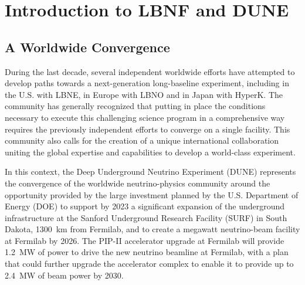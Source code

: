 

\chapter{Introduction to LBNF and DUNE}
\label{ch:project-overview}

%
%
\section{A Worldwide Convergence}

During the last decade, several independent worldwide efforts have attempted to develop paths towards a next-generation long-baseline experiment, including in the U.S. with LBNE, in Europe with LBNO and in Japan with HyperK.  The community has %
generally recognized that putting in place %
the conditions necessary to 
execute this challenging science program in a comprehensive way requires the previously independent 
efforts to converge on a single facility. This community %
also calls for the creation of a unique international collaboration uniting %
the global expertise and capabilities  to develop a world-class experiment.

In this context, the Deep Underground Neutrino Experiment (DUNE) represents the convergence of the worldwide neutrino-physics community around the opportunity provided by the large investment planned by the U.S. Department of Energy (DOE) to support by 2023 a significant expansion of the underground infrastructure at the Sanford Underground Research Facility (SURF) in South Dakota, \SI{1300}{\km} from Fermilab, and to create a megawatt neutrino-beam facility at Fermilab by 2026.  The PIP-II accelerator upgrade at Fermilab will provide \SI{1.2}{\MW} of power to drive the new neutrino beamline at Fermilab, with a plan that could further upgrade the 
accelerator complex to enable it to provide up to \SI{2.4}{\MW} of beam power by 2030.  

